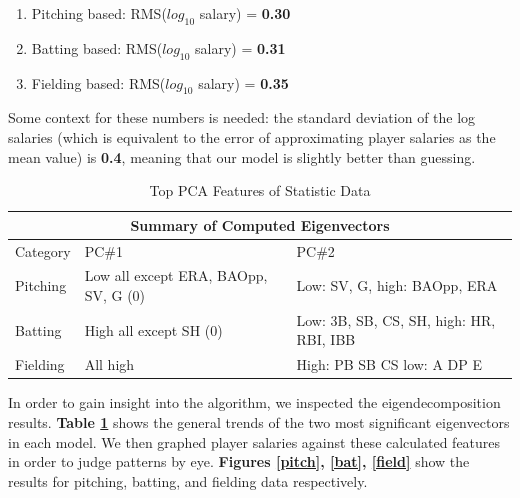 \documentclass[12pt, letterpaper]{article}
\begin{document}
\begin{enumerate}
    \item Pitching based: RMS($log_{10}$ salary) = \textbf{0.30}
    \item Batting based:  RMS($log_{10}$ salary) = \textbf{0.31}
    \item Fielding based: RMS($log_{10}$ salary) = \textbf{0.35}
\end{enumerate}

Some context for these numbers is needed: the standard deviation of the log salaries (which is equivalent to the error of approximating player salaries as the mean value) is \textbf{0.4}, meaning that our model is slightly better than guessing. 

\begin{table}
\begin{center}
\begin{tabular}{|p{2cm}||p{4cm}|p{4cm}|}
\hline
\multicolumn{3}{|c|}{Summary of Computed Eigenvectors} \\
\hline
Category & PC\#1 & PC\#2\\
\hline
\hline
Pitching & Low all except ERA, BAOpp, SV, G (0) & Low: SV, G, high: BAOpp, ERA\\
\hline
Batting & High all except SH (0) & Low: 3B, SB, CS, SH, high: HR, RBI, IBB\\
\hline
Fielding & All high & High: PB SB CS low: A DP E\\
\hline

\end{tabular}
\end{center}
\caption{Top PCA Features of Statistic Data}
\label{eigs}
\end{table}

In order to gain insight into the algorithm, we inspected the eigendecomposition results. \textbf{Table \ref{eigs}} shows the general trends of the two most significant eigenvectors in each model. We then graphed player salaries against these calculated features in order to judge patterns by eye. \textbf{Figures \ref{pitch}, \ref{bat}, \ref{field}} show the results for pitching, batting, and fielding data respectively.
\end{document}
